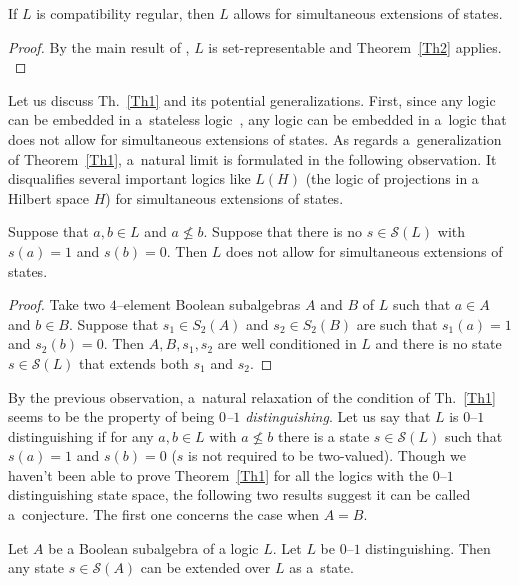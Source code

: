 \documentclass{article}
\begin{document}
{\begin{theorem}\label{Th2}
If $L$ is compatibility regular, then $L$ allows for simultaneous extensions of states.
\end{theorem}

\begin{proof}
By the main result of \cite{NavaraPtak},
$L$ is set-representable and Theorem~\ref{Th2} applies.\\

\end{proof}

Let us discuss Th.~\ref{Th1} and its potential generalizations.
First, since any logic can be embedded in a~stateless logic~\cite{Greechie, NavaraPtakRogalewicz}, any logic can be embedded in a~logic that does not allow for simultaneous extensions of states.
As regards a~generalization of Theorem~\ref{Th1}, a~natural
limit is formulated in the following
observation. It disqualifies
several important logics like $L(H)$
(the logic of projections in a Hilbert
space $H$) for simultaneous extensions of states. 


\begin{proposition}\label{Prop1}
Suppose that $a,b\in L$ and $a\not\leq b$.
Suppose that there is no $s\in \mathcal{S}(L)$ with
$s(a)=1$ and $s(b)=0$. Then $L$ does not allow for simultaneous extensions of states.
\end{proposition}

\begin{proof}
Take two $4$--element Boolean subalgebras $A$ and $B$ of $L$
such that $a\in A$ and $b\in B$. Suppose that $s_1\in S_2(A)$ and $s_2\in S_2(B)$ are such that
$s_1(a)=1$ and $s_2(b)=0$. Then $A,B,s_1,s_2$ are well conditioned in $L$ and there is no
state $s\in \mathcal{S}(L)$ that extends both $s_1$ and $s_2$.
\end{proof}

By the previous observation, a~natural relaxation of the condition of Th.~\ref{Th1} seems to be the property of being \textit{$0$--$1$ distinguishing}. Let us say that $L$ is $0$--$1$ distinguishing if for any $a,b\in L$ with $a\not\leq b$ there is a state $s\in \mathcal{S}(L)$ such that
$s(a)=1$ and $s(b)=0$ ($s$ is not required to be two-valued). 
Though we haven't been able to prove Theorem~\ref{Th1} for all the logics with the $0$--$1$ distinguishing state space, the following two results suggest it can be called a~conjecture. The first one concerns the case when $A=B$.

\begin{proposition}\label{Prop2}
Let $A$ be a Boolean subalgebra of a logic $L$. Let $L$ be $0$--$1$ distinguishing. Then any state $s\in \mathcal{S}(A)$ can be extended over $L$ as a~state.
\end{proposition}

}
\end{document}
